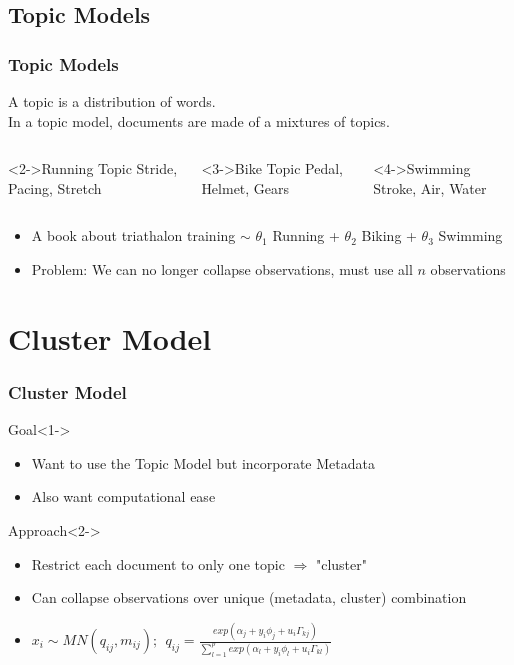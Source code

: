 \documentclass[handout]{beamer}
\begin{document}
\subsection{Topic Models}
\begin{frame}
 \frametitle{Topic Models}
A topic is a distribution of words. \\
In a topic model, documents are made of a mixtures of topics. 

\begin{columns}
\begin{block}<2->{Running Topic}
Stride, Pacing, Stretch
\end{block}
\begin{block}<3->{Bike Topic}
Pedal, Helmet, Gears
\end{block}
\begin{block}<4->{Swimming}
Stroke, Air, Water
\end{block}
\end{columns}
\begin{itemize}
\item<5-> A book about triathalon training $\sim$ $\theta_1$ Running + $\theta_2$ Biking + $\theta_3$ Swimming
\item<6-> Problem: We can no longer collapse observations, must use all $n$ observations
\end{itemize}
\end{frame}



\section{Cluster Model}
\begin{frame}
 \frametitle{Cluster Model}
\begin{block}{Goal}<1->
\begin{itemize}
\item Want to use the Topic Model but incorporate Metadata
\item Also want computational ease
\end{itemize}
\end{block}

\begin{block}{Approach}<2->
\begin{itemize}
\item Restrict each document to only one topic $\Rightarrow$ "cluster"
\item Can collapse observations over unique (metadata, cluster) combination
\item $ x_{i} \sim MN(q_{ij},m_{ij})    ; ~~  q_{ij} = \frac{exp(\alpha_j + y_i \phi_j + u_i \Gamma_{kj})}{\sum_{l=1}^{p}{exp(\alpha_l+ y_i \phi_l + u_i \Gamma_{kl})}} $
\end{itemize}
\end{block}
\end{frame}
\end{document}
